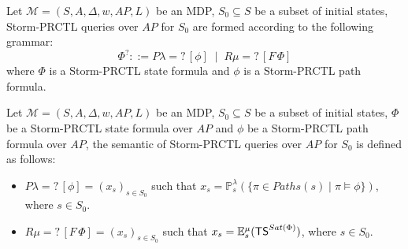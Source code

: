\begin{definition}
Let $\mathcal{M} = (S, A, \Delta, w, AP, L)$ be an MDP, $S_0 \subseteq S$ be a subset of initial states, Storm-PRCTL queries over $AP$ for $S_0$ are formed according to the following grammar:
\[
  \Phi^? ::= P\lambda=?\,[\phi] \; \; | \; \; R\mu=?\,[F\,\Phi]
\]
where $\Phi$ is a Storm-PRCTL state formula and $\phi$ is a Storm-PRCTL path formula.
\end{definition}

\begin{definition}
 Let $\mathcal{M}=(S, A, \Delta, w, AP, L)$ be an MDP, $S_0 \subseteq S$ be a subset of initial states, $\Phi$ be a Storm-PRCTL state formula over $AP$ and $\phi$ be a Storm-PRCTL path formula over $AP$, the semantic of Storm-PRCTL queries over $AP$ for $S_0$ is defined as follows:
 \begin{itemize}
   \item $P\lambda=? \, [\phi] = (x_s)_{s \in S_0}$ such that $x_s = \mathbb{P}^\lambda_s(\{ \pi \in Paths(s) \; | \; \pi \models \phi \})$, where $s \in S_0$.
   \item $R\mu=? \, [F\,\Phi] = (x_s)_{s \in S_0}$ such that $x_s = \mathbb{E}^\mu_s(\text{\sffamily TS}^{Sat(\Phi)})$, where $s \in S_0$.
 \end{itemize}
\end{definition}
